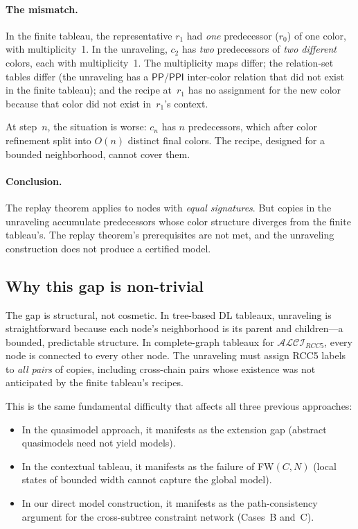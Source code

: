 \documentclass[a4paper,11pt]{article}
\theoremstyle{definition}
\newcommand{\ALCIRCC}[1]{\ensuremath{\mathcal{ALCI}_{\mathit{RCC#1}}}}
\newcommand{\PP}{\ensuremath{\mathsf{PP}}}
\newcommand{\PPI}{\ensuremath{\mathsf{PPI}}}
\begin{document}
\paragraph{The mismatch.}
In the finite tableau, the representative $r_1$ had \emph{one}
predecessor ($r_0$) of one color, with multiplicity~1.  In the
unraveling, $c_2$ has \emph{two} predecessors of \emph{two different}
colors, each with multiplicity~1.  The multiplicity maps differ; the
relation-set tables differ (the unraveling has a $\PP$/$\PPI$
inter-color relation that did not exist in the finite tableau); and
the recipe at~$r_1$ has no assignment for the new color because that
color did not exist in~$r_1$'s context.

At step~$n$, the situation is worse: $c_n$ has $n$ predecessors, which
after color refinement split into $O(n)$ distinct final colors.  The
recipe, designed for a bounded neighborhood, cannot cover them.

\paragraph{Conclusion.}
The replay theorem applies to nodes with \emph{equal signatures}.  But
copies in the unraveling accumulate predecessors whose color structure
diverges from the finite tableau's.  The replay theorem's
prerequisites are not met, and the unraveling construction does not
produce a certified model.

\subsection{Why this gap is non-trivial}
\label{sec:why-hard}

The gap is structural, not cosmetic.  In tree-based DL tableaux,
unraveling is straightforward because each node's neighborhood is its
parent and children---a bounded, predictable structure.  In
complete-graph tableaux for $\ALCIRCC{5}$, every node is connected to
every other node.  The unraveling must assign RCC5 labels to
\emph{all pairs} of copies, including cross-chain pairs whose
existence was not anticipated by the finite tableau's recipes.

This is the same fundamental difficulty that affects all three
previous approaches:
\begin{itemize}[nosep]
\item In the quasimodel approach, it manifests as the extension gap
  (abstract quasimodels need not yield models).
\item In the contextual tableau, it manifests as the failure of
  FW$(C,N)$ (local states of bounded width cannot capture
  the global model).
\item In our direct model construction, it manifests as the
  path-consistency argument for the cross-subtree constraint network
  (Cases~B and~C).
\end{itemize}
\end{document}
